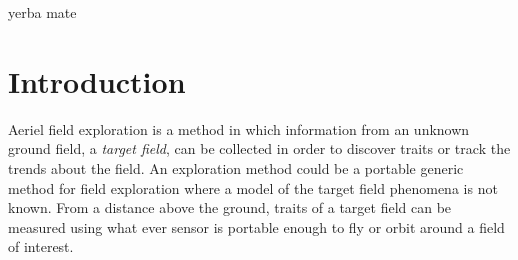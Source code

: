 \documentclass[11pt]{ucthesis}
\begin{document}
\begin{frontmatter}
\begin{dedication}
\null\vfil
{\large
\begin{center}
yerba mate
\vspace{12pt}
\end{center}}
\vfil\null
\end{dedication}


\begin{acknowledgements}
\end{acknowledgements}

\end{frontmatter}
\chapter{Introduction}
Aeriel field exploration is a method in which information from an unknown ground field, a \textit{target field}, can be collected in order to discover traits or track the trends about the field. An exploration method could be a portable generic method for field exploration where a model of the target field phenomena is not known. From a distance above the ground, traits of a target field can be measured using what ever sensor is portable enough to fly or orbit around a field of interest.
\end{document}
